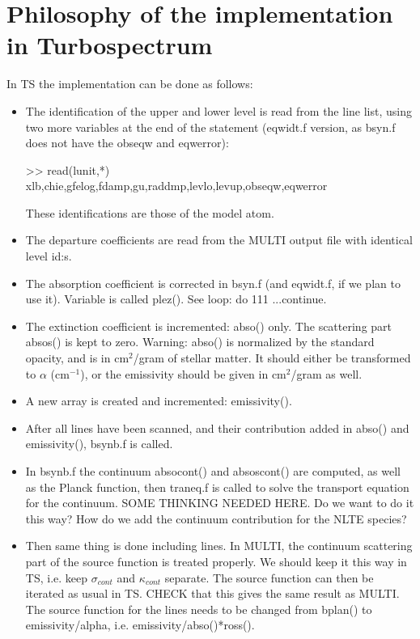 \documentclass[a4paper,12pt]{article}
\begin{document}
\section{Philosophy of the implementation in Turbospectrum}
In TS  the implementation can be done as follows:
\begin{itemize}
\item The identification of the upper and lower level is read from the line list, using two more variables at the end of the statement (eqwidt.f version, as bsyn.f does not have the obseqw and eqwerror):

 >> read(lunit,*) xlb,chie,gfelog,fdamp,gu,raddmp,levlo,levup,obseqw,eqwerror

These identifications are those of the model atom.

\item The departure coefficients are read from the MULTI output file with identical level id:s.
\item The absorption coefficient is corrected in bsyn.f (and eqwidt.f, if we plan to use it). Variable is called plez(). See loop: do 111 ...continue.
\item The extinction coefficient is incremented: abso() only. The scattering part absos() is kept to zero. 
Warning: abso() is normalized by the standard opacity, and is in cm$^2$/gram of stellar matter. It should either be transformed to $\alpha$ (cm$^{-1}$), or the emissivity should be given in cm$^2$/gram as well.
\item A new array is created and incremented: emissivity().
\item  After all lines have been scanned, and their contribution added in abso() and emissivity(), bsynb.f is called.
\item In bsynb.f the continuum absocont() and absoscont() are computed, as well as the Planck function, 
then traneq.f is called to solve the transport equation for the continuum. SOME THINKING NEEDED HERE. 
Do we want to do it this way? How do we add the continuum contribution for the NLTE species?
\item Then same thing is done including lines. In MULTI, the continuum scattering part of the source function is treated properly. We should keep it this way in TS, i.e. keep $\sigma_{cont}$ and $\kappa_{cont}$ separate. The source function can then 
be iterated as usual in TS. CHECK that this gives the same result as MULTI. The source function for the lines
needs to be changed from bplan() to emissivity/alpha, i.e. emissivity/abso()*ross(). 
\end{itemize}
\end{document}
